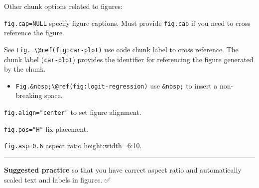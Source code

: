 \documentclass[
  a4paper,
  twoside,
  openright]{book}
\providecommand{\tightlist}{%
  \setlength{\itemsep}{0pt}\setlength{\parskip}{0pt}}
\theoremstyle{definition}
\theoremstyle{definition}
\theoremstyle{definition}
\theoremstyle{definition}
\theoremstyle{remark}
\begin{document}
Other chunk options related to figures:

\texttt{fig.cap=NULL} specify figure captions. Must provide \texttt{fig.cap} if you need to cross reference the figure.

See {\texttt{Fig.\ \textbackslash{}@ref(fig:car-plot)}} use code chunk label to cross reference. The chunk label (\texttt{car-plot}) provides the identifier for referencing the figure generated by the chunk.

\begin{itemize}
\tightlist
\item
  \texttt{Fig.\&nbsp;\textbackslash{}@ref(fig:logit-regression)} use \texttt{\&nbsp;} to insert a {non-breaking space}.
\end{itemize}

{\texttt{fig.align="center"}} to set figure alignment.

\texttt{fig.pos="H"} fix placement.

{\texttt{fig.asp=0.6}} aspect ratio height:width=6:10.

\begin{center}\rule{0.5\linewidth}{0.5pt}\end{center}

{\textbf{Suggested practice}} so that you have correct aspect ratio and automatically scaled text and labels in figures. ✅
\end{document}
